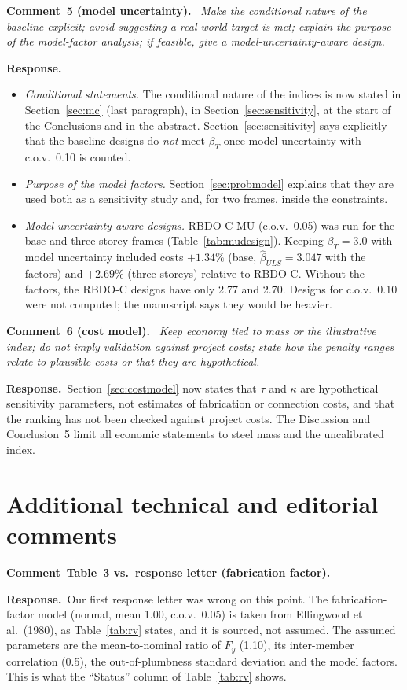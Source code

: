 \documentclass[11pt]{article}
\newenvironment{comment}[1]{\par\medskip\noindent\textbf{Comment~#1.}\ \itshape}{\par}
\newcommand{\resp}{\par\noindent\textbf{Response.}\ }
\begin{document}
\begin{comment}{5 (model uncertainty)}
Make the conditional nature of the baseline explicit; avoid suggesting a real-world target is met;
explain the purpose of the model-factor analysis; if feasible, give a model-uncertainty-aware design.
\end{comment}
\resp
\begin{itemize}[itemsep=0.1em]
\item \emph{Conditional statements.} The conditional nature of the indices is now stated in
Section~\ref{sec:mc} (last paragraph), in Section~\ref{sec:sensitivity}, at the start of the
Conclusions and in the abstract. Section~\ref{sec:sensitivity} says explicitly that the baseline
designs do \emph{not} meet $\beta_T$ once model uncertainty with c.o.v.\ 0.10 is counted.
\item \emph{Purpose of the model factors.} Section~\ref{sec:probmodel} explains that they are used
both as a sensitivity study and, for two frames, inside the constraints.
\item \emph{Model-uncertainty-aware designs.} RBDO-C-MU (c.o.v.\ 0.05) was run for the base and
three-storey frames (Table~\ref{tab:mudesign}). Keeping $\beta_T=3.0$ with model uncertainty
included costs $+1.34\%$ (base, $\hat\beta_{ULS}=3.047$ with the factors) and $+2.69\%$ (three
storeys) relative to RBDO-C. Without the factors, the RBDO-C designs have only 2.77 and 2.70. Designs
for c.o.v.\ 0.10 were not computed; the manuscript says they would be heavier.
\end{itemize}

\begin{comment}{6 (cost model)}
Keep economy tied to mass or the illustrative index; do not imply validation against project
costs; state how the penalty ranges relate to plausible costs or that they are hypothetical.
\end{comment}
\resp Section~\ref{sec:costmodel} now states that $\tau$ and $\kappa$ are hypothetical sensitivity
parameters, not estimates of fabrication or connection costs, and that the ranking has not been
checked against project costs. The Discussion and Conclusion~5 limit all economic statements to steel
mass and the uncalibrated index.

\section*{Additional technical and editorial comments}

\begin{comment}{Table~3 vs.\ response letter (fabrication factor)}
\end{comment}
\resp Our first response letter was wrong on this point. The fabrication-factor model (normal, mean
1.00, c.o.v.\ 0.05) is taken from Ellingwood et al.\ (1980), as Table~\ref{tab:rv} states, and it
is sourced, not assumed. The assumed parameters are the mean-to-nominal ratio of $F_y$ (1.10), its
inter-member correlation (0.5), the out-of-plumbness standard deviation and the model factors. This
is what the ``Status'' column of Table~\ref{tab:rv} shows.
\end{document}
